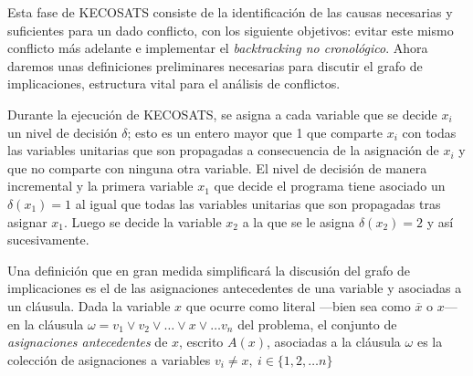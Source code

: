 \documentclass[12pt,lettersize,oneside]{article}
\begin{document}
Esta fase de KECOSATS consiste de la identificación de las causas necesarias y
suficientes para un dado conflicto, con los siguiente objetivos: evitar este
mismo conflicto más adelante e implementar el \emph{backtracking no
  cronológico}.  Ahora daremos unas definiciones preliminares necesarias para
discutir el grafo de implicaciones, estructura vital para el análisis de
conflictos.



Durante la ejecución de KECOSATS, se asigna a cada variable que se decide $x_i$
un nivel de decisión $\delta$; esto es un entero mayor que 1 que comparte $x_i$
con todas las variables unitarias que son propagadas a consecuencia de la
asignación de $x_i$ y que no comparte con ninguna otra variable. El nivel de
decisión de manera incremental y la primera variable $x_1$ que decide el
programa tiene asociado un $\delta(x_1) =1$ al igual que todas las variables
unitarias que son propagadas tras asignar $x_1$. Luego se decide la variable
$x_2$ a la que se le asigna $\delta(x_2)=2$ y así sucesivamente.

Una definición que en gran medida simplificará la discusión del grafo de
implicaciones es el de las asignaciones antecedentes de una variable y
asociadas a un cláusula. Dada la variable $x$ que ocurre como literal ---bien
sea como $\overline{x}$ o $x$--- en la cláusula $\omega = v_1 \vee v_2 \vee
\ldots \vee x \vee \ldots v_n$ del problema, el conjunto de \emph{asignaciones
  antecedentes} de $x$, escrito $A(x)$, asociadas a la cláusula $\omega$ es
la colección de asignaciones a variables $v_i \neq x,\ i \in \{1,2,\ldots n\}$
\end{document}
